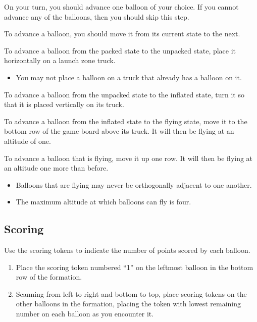 \documentclass[a6paper, 11pt, parskip=half, DIV=15]{scrartcl}
\begin{document}
On your turn, you should advance one balloon of your choice. If you cannot advance any of the balloons, then you should skip this step.

\newpage
To advance a balloon, you should move it from its current state to the next.
\begin{description}[leftmargin=0pt]
  \item[Unpack:] To advance a balloon from the packed state to the unpacked state, place it horizontally on a launch zone truck.
  \begin{itemize}
    \item You may not place a balloon on a truck that already has a balloon on it.
  \end{itemize}
  \item[Inflate:] To advance a balloon from the unpacked state to the inflated state, turn it so that it is placed vertically on its truck.
  \item[Launch:] To advance a balloon from the inflated state to the flying state, move it to the bottom row of the game board above its truck. It will then be flying at an altitude of one.
  \item[Ascend:] To advance a balloon that is flying, move it up one row. It will then be flying at an altitude one more than before.
  \begin{itemize}
    \item Balloons that are flying may never be orthogonally adjacent to one another.%
    \item The maximum altitude at which balloons can fly is four.
  \end{itemize}
\end{description}

\newpage
\enlargethispage{1.75\baselineskip}
\subsection*{Scoring}

Use the scoring tokens to indicate the number of points scored by each balloon.
\begin{enumerate}
  \item Place the scoring token numbered ``1'' on the leftmost balloon in the bottom row of the formation.
  \item Scanning from left to right and bottom to top, place scoring tokens on the other balloons in the formation, placing the token with lowest remaining number on each balloon as you encounter it.
\end{enumerate}
\end{document}
